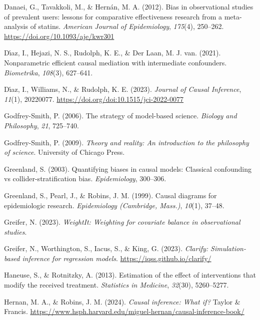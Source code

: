 \documentclass[
  single column]{article}
\newlength{\cslhangindent}
\newenvironment{CSLReferences}[2] %
 {\begin{list}{}{%
  \setlength{\itemindent}{0pt}
  \setlength{\leftmargin}{0pt}
  \setlength{\parsep}{0pt}
  \ifodd #1
   \setlength{\leftmargin}{\cslhangindent}
   \setlength{\itemindent}{-1\cslhangindent}
  \fi
  \setlength{\itemsep}{#2\baselineskip}}}
 {\end{list}}
\begin{document}
\begin{CSLReferences}{1}{0}
Danaei, G., Tavakkoli, M., \& Hernán, M. A. (2012). Bias in
observational studies of prevalent users: lessons for comparative
effectiveness research from a meta-analysis of statins. \emph{American
Journal of Epidemiology}, \emph{175}(4), 250--262.
\url{https://doi.org/10.1093/aje/kwr301}

Dı́az, I., Hejazi, N. S., Rudolph, K. E., \& Der Laan, M. J. van. (2021).
Nonparametric efficient causal mediation with intermediate confounders.
\emph{Biometrika}, \emph{108}(3), 627--641.

Dı́az, I., Williams, N., \& Rudolph, K. E. (2023). \emph{Journal of
Causal Inference}, \emph{11}(1), 20220077.
\url{https://doi.org/doi:10.1515/jci-2022-0077}

Godfrey-Smith, P. (2006). The strategy of model-based science.
\emph{Biology and Philosophy}, \emph{21}, 725--740.

Godfrey-Smith, P. (2009). \emph{Theory and reality: An introduction to
the philosophy of science}. University of Chicago Press.

Greenland, S. (2003). Quantifying biases in causal models: Classical
confounding vs collider-stratification bias. \emph{Epidemiology},
300--306.

Greenland, S., Pearl, J., \& Robins, J. M. (1999). Causal diagrams for
epidemiologic research. \emph{Epidemiology (Cambridge, Mass.)},
\emph{10}(1), 37--48.

Greifer, N. (2023). \emph{WeightIt: Weighting for covariate balance in
observational studies}.

Greifer, N., Worthington, S., Iacus, S., \& King, G. (2023).
\emph{Clarify: Simulation-based inference for regression models}.
\url{https://iqss.github.io/clarify/}

Haneuse, S., \& Rotnitzky, A. (2013). Estimation of the effect of
interventions that modify the received treatment. \emph{Statistics in
Medicine}, \emph{32}(30), 5260--5277.

Hernan, M. A., \& Robins, J. M. (2024). \emph{Causal inference: What
if?} Taylor \& Francis.
\url{https://www.hsph.harvard.edu/miguel-hernan/causal-inference-book/}


\end{CSLReferences}
\end{document}
